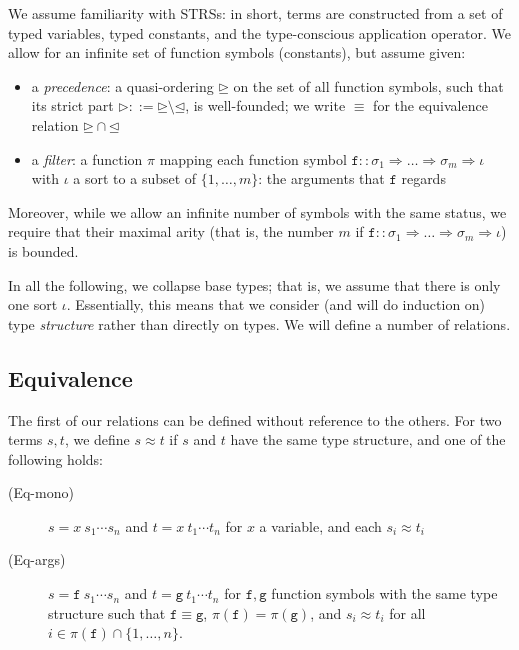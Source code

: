 \documentclass[a4paper,USenglish,cleveref,autoref,thm-restate]{lipics-v2021}
\newcommand{\arrtype}{\Rightarrow}
\newcommand{\ismain}{\approx}
\newcommand{\grpred}{\rhd}
\newcommand{\geqpred}{\unrhd}
\newcommand{\leqpred}{\unlhd}
\newcommand{\eqpred}{\equiv}
\newcommand{\symb}[1]{\mathtt{#1}}
\newcommand{\afun}{\symb{f}}
\newcommand{\bfun}{\symb{g}}
\newcommand{\atype}{\sigma}
\newcommand{\asort}{\iota}
\newcommand{\avar}{x}
\newcommand{\filter}{\pi}
\begin{document}
We assume familiarity with STRSs: in short, terms are constructed from a set of typed variables,
typed constants, and the type-conscious application operator.  We allow for an infinite set of
function symbols (constants), but assume given:
\begin{itemize}
\item a \emph{precedence}: a quasi-ordering $\geqpred$ on the set of all function symbols, such
  that its strict part $\grpred ::= \geqpred \setminus \leqpred$, is well-founded;
  we write $\eqpred$ for the equivalence relation $\geqpred \cap \leqpred$  
\item a \emph{filter}: a function $\filter$ mapping each function symbol $\afun :: \atype_1
  \arrtype \dots \arrtype \atype_m \arrtype \asort$ with $\asort$ a sort to a subset of
  $\{1,\dots,m\}$: the arguments that $\afun$ regards
\end{itemize}
Moreover, while we allow an infinite number of symbols with the same status, we require that their
maximal arity (that is, the number $m$ if $\afun :: \atype_1 \arrtype \dots \arrtype \atype_m
\arrtype \asort$) is bounded.

\medskip
In all the following, we collapse base types; that is, we assume that there is only one sort
$\asort$.  Essentially, this means that we consider (and will do induction on) type \emph{structure}
rather than directly on types.
We will define a number of relations.

\subsection{Equivalence}
The first of our relations can be defined without reference to the others.
For two terms $s,t$, we define $s \ismain t$ if $s$ and $t$ have the same type structure, and one of
the following holds:
\begin{description}
\item[(Eq-mono)] $s = \avar\ s_1 \cdots s_n$ and $t = \avar\ t_1 \cdots t_n$ for $\avar$ a variable,
  and each $s_i \ismain t_i$
\item[(Eq-args)] $s = \afun\ s_1 \cdots s_n$ and $t = \bfun\ t_1 \cdots t_n$ for $\afun,\bfun$
  function symbols with the same type structure such that
  $\afun \eqpred \bfun$,
  $\filter(\afun) = \filter(\bfun)$, and 
  $s_i \ismain t_i$ for all $i \in \filter(\afun) \cap \{1,\dots,n\}$.
\end{description}
\end{document}
